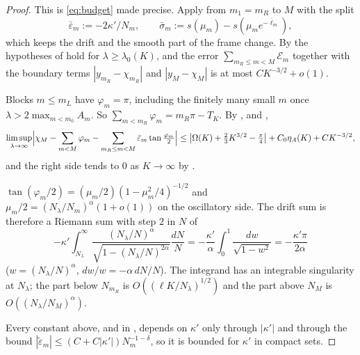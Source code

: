 \begin{proof}
This is \eqref{eq:budget} made precise. Apply  from $m_1=m_R$ to $M$
with the split
\[
  \bar\varepsilon_m:=-2\kappa'/N_m,\qquad \bar\sigma_m:=s(\mu_m)-s(\mu_me^{-\bar\ell_m}),
\]
which keeps the drift and the smooth part of the frame change. By 
the hypotheses of  hold for $\lambda\ge\lambda_0(K)$, and the error
$\sum_{m_R\le m<M}\mathcal E_m$ together with the boundary terms $|y_{m_R}-\chi_{m_R}|$ and
$|y_M-\chi_M|$ is at most $CK^{-3/2}+o(1)$.

 Blocks $m\le m_L$ have $\varphi_m=\pi$, including the finitely many small
$m$ once $\lambda>2\max_{m<m_0}A_m$. So $\sum_{m<m_R}\varphi_m=m_R\pi-T_K$. By ,
 and ,
\[
  \limsup_{\lambda\to\infty}\Bigl|\chi_M-\sum_{m<M}\varphi_m-\sum_{m_R\le m<M}\bar\varepsilon_m\tan\tfrac{\varphi_m}2\Bigr|
  \le\bigl|\Omega(K)+\tfrac23K^{3/2}-\tfrac\pi4\bigr|+C_0\eta_A(K)+CK^{-3/2},
\]
and the right side tends to $0$ as $K\to\infty$ by .

 $\tan(\varphi_m/2)=(\mu_m/2)(1-\mu_m^2/4)^{-1/2}$ and
$\mu_m/2=(N_\lambda/N_m)^\alpha(1+o(1))$ on the oscillatory side. The drift sum is therefore a
Riemann sum with step $2$ in $N$ of
\[
  -\kappa'\int_{N_\lambda}^\infty\frac{(N_\lambda/N)^\alpha}{\sqrt{1-(N_\lambda/N)^{2\alpha}}}\frac{dN}{N}
  =-\frac{\kappa'}{\alpha}\int_0^1\frac{dw}{\sqrt{1-w^2}}=-\frac{\kappa'\pi}{2\alpha}
\]
($w=(N_\lambda/N)^\alpha$, $dw/w=-\alpha\,dN/N$). The integrand has an integrable singularity at
$N_\lambda$; the part below $N_{m_R}$ is $O((\ell K/N_\lambda)^{1/2})$ and the part above $N_M$ is
$O((N_\lambda/N_M)^\alpha)$.

 Every constant above, and in , depends on $\kappa'$ only
through $|\kappa'|$ and through the bound $|\tilde\varepsilon_m|\le(C+C|\kappa'|)N_m^{-1-\delta}$,
so it is bounded for $\kappa'$ in compact sets.
\end{proof}
